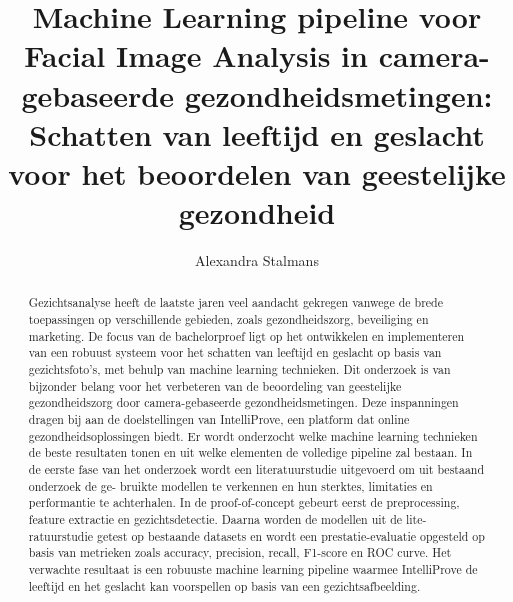 \documentclass{hogent-article}
\title{Machine Learning pipeline voor Facial Image Analysis in camera-gebaseerde gezondheidsmetingen: Schatten van leeftijd en geslacht voor het beoordelen van geestelijke gezondheid}
\author{Alexandra Stalmans}
\begin{document}
\begin{abstract}
Gezichtsanalyse heeft de laatste jaren veel aandacht gekregen vanwege de brede toepassingen op verschillende
gebieden, zoals gezondheidszorg, beveiliging en marketing.  
De focus van de bachelorproef ligt op het ontwikkelen en implementeren van een robuust systeem voor het schatten van leeftijd en geslacht op basis van gezichtsfoto’s, met behulp van machine learning technieken. Dit onderzoek is van bijzonder belang voor het verbeteren van de beoordeling van geestelijke gezondheidszorg door camera-gebaseerde gezondheidsmetingen. Deze inspanningen dragen bij aan de doelstellingen van IntelliProve, een platform dat online gezondheidsoplossingen biedt. Er wordt onderzocht welke machine learning technieken de beste resultaten tonen en uit welke elementen de volledige pipeline zal bestaan.   
In de eerste fase van het onderzoek wordt een literatuurstudie uitgevoerd om uit bestaand onderzoek de ge-
bruikte modellen te verkennen en hun sterktes, limitaties en performantie te achterhalen. In de proof-of-concept
gebeurt eerst de preprocessing, feature extractie en gezichtsdetectie. Daarna worden de modellen uit de lite-
ratuurstudie getest op bestaande datasets en wordt een prestatie-evaluatie opgesteld op basis van metrieken
zoals accuracy, precision, recall, F1-score en ROC curve. Het verwachte resultaat is een robuuste machine learning
pipeline waarmee IntelliProve de leeftijd en het geslacht kan voorspellen op basis van een gezichtsafbeelding.
\end{abstract}

\tableofcontents

\printbibliography[heading=bibintoc]
\end{document}

